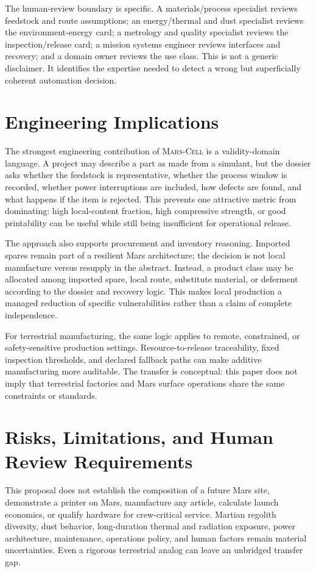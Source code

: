 \documentclass[conference]{../../../../Conference-LaTeX-template_10-17-19/IEEEtran}
\newcommand{\marscell}{\textsc{Mars-Cell}}
\begin{document}
The human-review boundary is specific. A materials/process specialist reviews feedstock and route assumptions; an energy/thermal and dust specialist reviews the environment-energy card; a metrology and quality specialist reviews the inspection/release card; a mission systems engineer reviews interfaces and recovery; and a domain owner reviews the use class. This is not a generic disclaimer. It identifies the expertise needed to detect a wrong but superficially coherent automation decision.

\section{Engineering Implications}
The strongest engineering contribution of \marscell{} is a validity-domain language. A project may describe a part as made from a simulant, but the dossier asks whether the feedstock is representative, whether the process window is recorded, whether power interruptions are included, how defects are found, and what happens if the item is rejected. This prevents one attractive metric from dominating: high local-content fraction, high compressive strength, or good printability can be useful while still being insufficient for operational release.

The approach also supports procurement and inventory reasoning. Imported spares remain part of a resilient Mars architecture; the decision is not local manufacture versus resupply in the abstract. Instead, a product class may be allocated among imported spare, local route, substitute material, or deferment according to the dossier and recovery logic. This makes local production a managed reduction of specific vulnerabilities rather than a claim of complete independence.

For terrestrial manufacturing, the same logic applies to remote, constrained, or safety-sensitive production settings. Resource-to-release traceability, fixed inspection thresholds, and declared fallback paths can make additive manufacturing more auditable. The transfer is conceptual: this paper does not imply that terrestrial factories and Mars surface operations share the same constraints or standards.

\section{Risks, Limitations, and Human Review Requirements}
This proposal does not establish the composition of a future Mars site, demonstrate a printer on Mars, manufacture any article, calculate launch economics, or qualify hardware for crew-critical service. Martian regolith diversity, dust behavior, long-duration thermal and radiation exposure, power architecture, maintenance, operations policy, and human factors remain material uncertainties. Even a rigorous terrestrial analog can leave an unbridged transfer gap.
\end{document}
